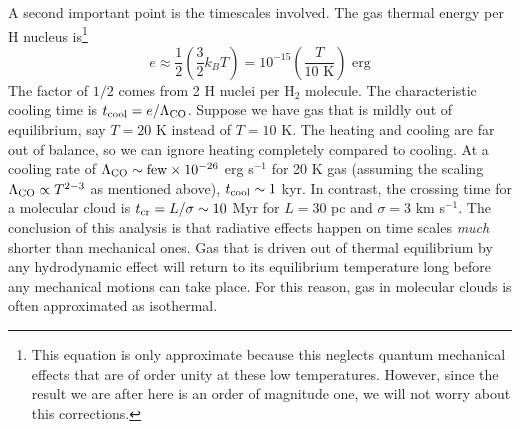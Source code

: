 A second important point is the timescales involved. The gas thermal energy per H nucleus is\footnote{This equation is only approximate because this neglects quantum mechanical effects that are of order unity at these low temperatures. However, since the result we are after here is an order of magnitude one, we will not worry about this corrections.}
\begin{equation}
e \approx \frac{1}{2}\left(\frac{3}{2}k_B T\right) = 10^{-15} \left(\frac{T}{10\mbox{ K}}\right)\mbox{ erg}
\end{equation}
The factor of $1/2$ comes from 2 H nuclei per H$_2$ molecule. The characteristic cooling time is $t_{\rm cool} = e/\Lambda_{\rm CO}$. Suppose we have gas that is mildly out of equilibrium, say $T=20$ K instead of $T=10$ K. The heating and cooling are far out of balance, so we can ignore heating completely compared to cooling. At a cooling rate of $\Lambda_{\rm CO} \sim \mathrm{few} \times 10^{-26}$ erg s$^{-1}$ for 20 K gas (assuming the scaling $\Lambda_{\rm CO} \propto T^{2-3}$ as mentioned above), $t_{\rm cool} \sim 1$ kyr. In contrast, the crossing time for a molecular cloud is $t_{\rm cr} = L/\sigma \sim 10$ Myr for $L=30$ pc and $\sigma = 3$ km s$^{-1}$. The conclusion of this analysis is that radiative effects happen on time scales {\it much} shorter than mechanical ones. Gas that is driven out of thermal equilibrium by any hydrodynamic effect will return to its equilibrium temperature long before any mechanical motions can take place. For this reason, gas in molecular clouds is often approximated as isothermal.
